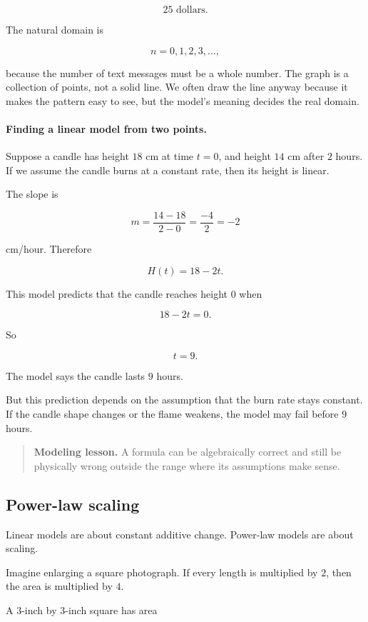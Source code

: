 \[
25\text{ dollars}.
\]

The natural domain is

\[
n=0,1,2,3,\ldots,
\]

because the number of text messages must be a whole number. The graph is a collection of points, not a solid line. We often draw the line anyway because it makes the pattern easy to see, but the model's meaning decides the real domain.

\paragraph{Finding a linear model from two points.}
Suppose a candle has height \(18\) cm at time \(t=0\), and height \(14\) cm after \(2\) hours. If we assume the candle burns at a constant rate, then its height is linear.

The slope is

\[
m=
\frac{14-18}{2-0}
=
\frac{-4}{2}
=
-2
\]

cm/hour. Therefore

\[
H(t)=18-2t.
\]

This model predicts that the candle reaches height \(0\) when

\[
18-2t=0.
\]

So

\[
t=9.
\]

The model says the candle lasts \(9\) hours.

But this prediction depends on the assumption that the burn rate stays constant. If the candle shape changes or the flame weakens, the model may fail before \(9\) hours.

\begin{quote}
\textbf{Modeling lesson.}
A formula can be algebraically correct and still be physically wrong outside the range where its assumptions make sense.
\end{quote}

\subsection{Power-law scaling}
\label{subsec:power-law-models}

Linear models are about constant additive change. Power-law models are about scaling.

Imagine enlarging a square photograph. If every length is multiplied by \(2\), then the area is multiplied by \(4\).

A \(3\)-inch by \(3\)-inch square has area

